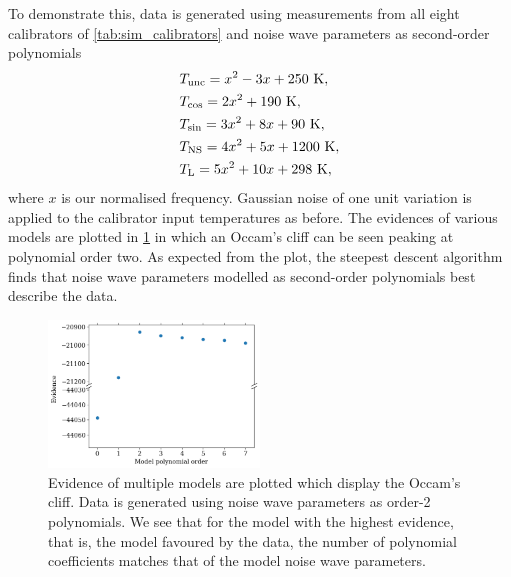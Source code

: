 To demonstrate this, data is generated using measurements from all eight calibrators of \cref{tab:sim_calibrators} and noise wave parameters as second-order polynomials
\begin{align*}
    & T_{\mathrm{unc}} = x^2 -3x + 250 \ \mathrm{K}, \\
    & T_{\mathrm{cos}} = 2x^2 + 190 \ \mathrm{K}, \\
    & T_{\mathrm{sin}} = 3x^2 + 8x + 90 \ \mathrm{K}, \\
    & T_{\mathrm{NS}} = 4x^2 + 5x + 1200 \ \mathrm{K}, \\
    & T_{\mathrm{L}} = 5x^2 + 10x + 298 \ \mathrm{K},
\end{align*}
where $x$ is our normalised frequency. Gaussian noise of one unit variation is applied to the calibrator input temperatures as before. The evidences of various models are plotted in \cref{fig:evidence} in which an Occam's cliff can be seen peaking at polynomial order two. As expected from the plot, the steepest descent algorithm finds that noise wave parameters modelled as second-order polynomials best describe the data.

\begin{figure}
    \centering
    \includegraphics[width=0.5\textwidth]{sim_evidence}
    \caption{Evidence of multiple models are plotted which display the Occam's cliff. Data is generated using noise wave parameters as order-2 polynomials. We see that for the model with the highest evidence, that is, the model favoured by the data, the number of polynomial coefficients matches that of the model noise wave parameters.
    \label{fig:evidence}}
\end{figure}


